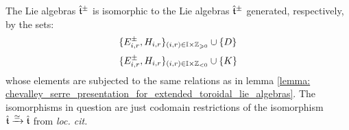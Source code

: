         \begin{corollary} \label{coro: chevalley_serre_presentation_for_extended_toroidal_lie_algebras}
            The Lie algebras $\hat{\mathfrak{t}}^{\pm}$ is isomorphic to the Lie algebras $\hat{\mathfrak{t}}^{\pm}$ generated, respectively, by the sets:
                $$\{ E_{i, r}^{\pm}, H_{i, r} \}_{(i, r) \in \simpleroots \x \Z_{\geq 0}} \cup \{D\}$$
                $$\{ E_{i, r}^{\pm}, H_{i, r} \}_{(i, r) \in \simpleroots \x \Z_{< 0}} \cup \{K\}$$
            whose elements are subjected to the same relations as in lemma \ref{lemma: chevalley_serre_presentation_for_extended_toroidal_lie_algebras}. The isomorphisms in question are just codomain restrictions of the isomorphism $\hat{\mathfrak{t}} \xrightarrow[]{\simeq} \hat{\mathfrak{t}}$ from \textit{loc. cit.}
        \end{corollary}